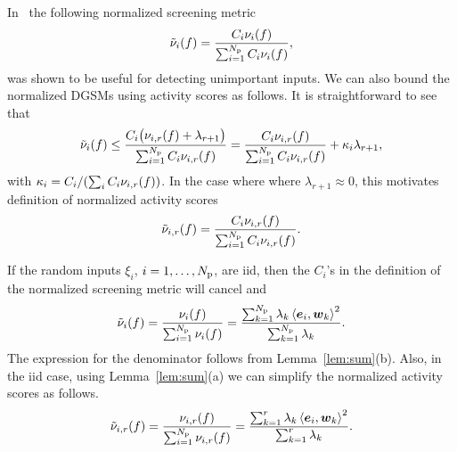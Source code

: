 In~\cite{Vohra:2018} the following normalized screening metric
\[
   \tilde{\nu}_i(f) = \frac{C_i \nu_i(f)}{\sum_{i=1}^\Np C_i \nu_i(f)},
\]
was shown to be useful for detecting unimportant inputs. 
We can also bound the normalized DGSMs using activity scores as follows. It is straightforward to see  
that
\[
\tilde{\nu}_i(f) \leq 
\frac{ C_i \big(\act{f}{i}{r} + \lambda_{r+1}\big)}{\sum_{i=1}^\Np C_i \act{f}{i}{r}}
=\frac{C_i \act{f}{i}{r}}{\sum_{i=1}^\Np C_i \act{f}{i}{r}} + \kappa_i \lambda_{r+1}, 
\]
with $\kappa_i = C_i / (\sum_i C_i \act{f}{i}{r})$. 
In the case where where $\lambda_{r+1} \approx 0$, 
this motivates definition of
normalized activity scores
\[
   \actt{f}{i}{r} =  \frac{C_i \act{f}{i}{r}}{\sum_{i=1}^\Np C_i \act{f}{i}{r}}.
\] 

\begin{remark}
If the random inputs $\xi_i$, $i = 1, \ldots, \Np$, are iid, then 
the $C_i$'s in the definition of the normalized screening metric will cancel and 
\[
    \tilde{\nu}_i(f) = \frac{\nu_i(f)}{\sum_{i=1}^\Np \nu_i(f)} 
      = \frac{\sum_{k=1}^\Np \lambda_k \ip{\vec{e}_i}{\vec{w}_k}^2}{\sum_{k = 1}^\Np \lambda_k}.
\]
The expression for the denominator follows from Lemma~\ref{lem:sum}(b). 
Also, in the iid case, using Lemma~\ref{lem:sum}(a) we can simplify the normalized activity scores as follows. 
\[
   \actt{f}{i}{r} =  \frac{\act{f}{i}{r}}{\sum_{i=1}^\Np \act{f}{i}{r}} = 
                     \frac{\sum_{k=1}^r \lambda_k \ip{\vec{e}_i}{\vec{w}_k}^2}
                          {\sum_{k = 1}^r \lambda_k}.
\]

\end{remark}
